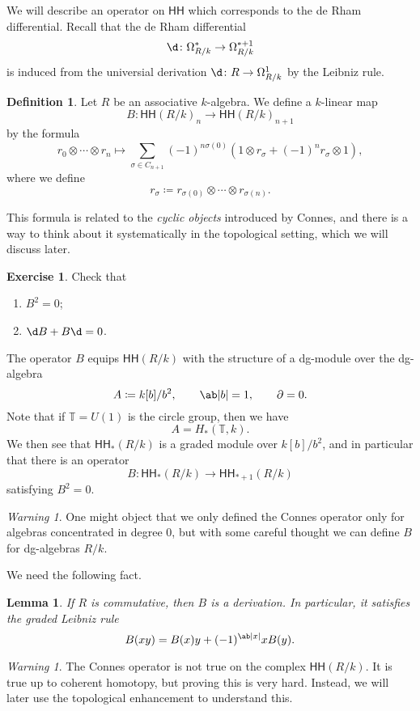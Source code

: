 \documentclass[10pt]{amsart}
\newtheorem{lem}[thm]{Lemma}
\theoremstyle{definition}
\newtheorem{defn}[thm]{Definition}
\newtheorem{exer}[thm]{Exercise}
\theoremstyle{remark}
\newtheorem{warn}[thm]{Warning}
\theoremstyle{plain}
\theoremstyle{definition}
\theoremstyle{remark}
\newcommand{\T}{\mathbb{T}}
\newcommand{\ms}[1]{\mathsf{#1}}
\newcommand{\1}{\mathbf{1}}
\newcommand{\2}{\mathbf{2}}
\newcommand{\3}{\mathbf{3}}
\newcommand{\HH}{\ms{HH}}
\begin{document}
We will describe an operator on $\HH$ which corresponds to the de Rham differential. Recall that the de Rham differential
\[ \d \colon \Omega^*_{R/k} \to \Omega^{*+1}_{R/k} \]
is induced from the universial derivation $\d \colon R \to \Omega^1_{R/k}$ by the Leibniz rule.

\begin{defn}
    Let $R$ be an associative $k$-algebra. We define a $k$-linear map
    \[ B \colon \HH(R/k)_n \to \HH(R/k)_{n+1} \]
    by the formula
    \[ r_0 \otimes \cdots \otimes r_n \mapsto \sum_{\sigma \in C_{n+1}} (-1)^{n\sigma(0)} (1 \otimes r_{\sigma} + (-1)^n r_{\sigma} \otimes 1), \]
    where we define
    \[ r_{\sigma} \coloneqq r_{\sigma(0)} \otimes \cdots \otimes r_{\sigma(n)}. \]
\end{defn}
This formula is related to the \textit{cyclic objects} introduced by Connes, and there is a way to think about it systematically in the topological setting, which we will discuss later.

\begin{exer}
    Check that
    \begin{enumerate}
        \item $B^2 = 0$;
        \item $\d B + B \d = 0$.
    \end{enumerate}
\end{exer}

The operator $B$ equips $\HH(R/k)$ with the structure of a dg-module over the dg-algebra
\[ A \coloneqq k[b]/b^2, \qquad \ab|b| = 1, \qquad \partial = 0. \]
Note that if $\T = U(1)$ is the circle group, then we have
\[ A = H_*(\T, k). \]
We then see that $\HH_*(R/k)$ is a graded module over $k[b]/b^2$, and in particular that there is an operator
\[ B \colon \HH_*(R/k) \to \HH_{*+1}(R/k) \]
satisfying $B^2 = 0$.

\begin{warn}
    One might object that we only defined the Connes operator only for algebras concentrated in degree $0$, but with some careful thought we can define $B$ for dg-algebras $R/k$.
\end{warn}

We need the following fact.
\begin{lem}
    If $R$ is commutative, then $B$ is a derivation. In particular, it satisfies the graded Leibniz rule
    \[ B(xy) = B(x) y + (-1)^{\ab|x|} x B(y). \]
\end{lem}

\begin{warn}
    The Connes operator is not true on the complex $\HH(R/k)$. It is true up to coherent homotopy, but proving this is very hard. Instead, we will later use the topological enhancement to understand this.
\end{warn}
\end{document}
